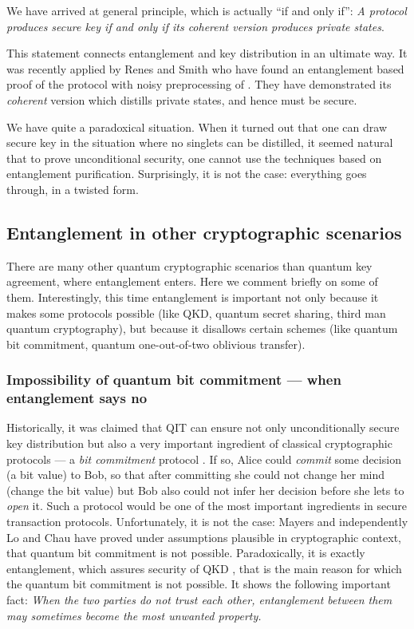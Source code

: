 \documentclass[rmp,12pt,preprint]{revtex4-2}
\begin{document}
We have arrived at general principle,  which is actually ``if and only if'':
{\it A protocol produces secure key if and only if its coherent version produces
private states}.

This statement connects entanglement and key distribution in an
ultimate way. It was recently applied by Renes and Smith
\cite{RenesSmith06} who have found an entanglement based proof of the
\pmp protocol with noisy preprocessing of
\cite{RGKinfo_sec_proof_short,RGKinfo_sec_proof_long}. They have
demonstrated its {\it coherent} version which distills private states,
and hence must be secure.

We have quite a paradoxical situation. When it  turned out that one
can draw secure key in the situation where no singlets can be
distilled, it seemed natural that to prove unconditional security,
one cannot use the  techniques based on entanglement purification.
Surprisingly, it is not the case: everything goes through, in a
twisted form.



\subsection{Entanglement in other cryptographic scenarios}
There are many other quantum cryptographic scenarios than quantum key agreement, where entanglement enters. Here we comment briefly on some of them. Interestingly, this time entanglement is important not only because it makes some protocols possible (like QKD, quantum secret sharing, third man quantum cryptography), but because it disallows certain schemes (like quantum bit commitment, quantum one-out-of-two oblivious transfer).

\subsubsection{Impossibility of quantum bit commitment --- when entanglement says no}
Historically, it was claimed that QIT can ensure not only
unconditionally secure key distribution but also a very important
ingredient of classical cryptographic protocols --- a {\it bit
commitment} protocol \cite{Unsec_bitcom}. If so, Alice could {\it
commit} some decision (a bit value) to Bob, so that after committing
she could not change her mind (change the bit value) but Bob also
could not infer her decision before she lets to {\it open} it. Such
a protocol would be one of the most important ingredients in secure
transaction protocols. Unfortunately, it is not the case: Mayers
\cite{Mayers_nobitcom1,Mayers_nobitcom2} and independently Lo and
Chau \cite{LoChau_nobitcom1,LoChau_nobitcom2} have proved under
assumptions plausible in cryptographic context, that quantum bit
commitment is not possible. Paradoxically, it is exactly
entanglement, which assures security of QKD , that is the main
reason for which the quantum bit commitment is not possible. It
shows the following important fact: {\it When the two parties do not
trust each other, entanglement between them may sometimes become the
most unwanted property.}
\end{document}
